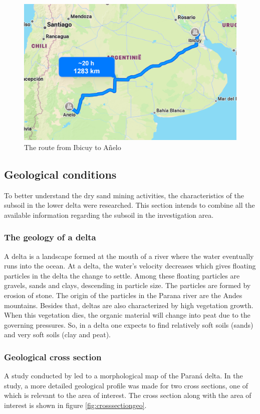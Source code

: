 \begin{figure}[H]
    \centering
    \includegraphics[width=0.6\linewidth]{figures/ch9/Routesand.png}
    \caption{The route from Ibicuy to Añelo}
    \label{fig:sandroute}
\end{figure}

\subsection{Geological conditions} \label{par:geology}
To better understand the dry sand mining activities, the characteristics of the subsoil in the lower delta were researched. This section intends to combine all the available information regarding the subsoil in the investigation area.

\subsubsection{The geology of a delta}
A delta is a landscape formed at the mouth of a river where the water eventually runs into the ocean. At a delta, the water's velocity decreases which gives floating particles in the delta the change to settle. Among these floating particles are gravels, sands and clays, descending in particle size. The particles are formed by erosion of stone. The origin of the particles in the Parana river are the Andes mountains. 
Besides that, deltas are also characterized by high vegetation growth. When this vegetation dies, the organic material will change into peat due to the governing pressures. So, in a delta one expects to find relatively soft soils (sands) and very soft soils (clay and peat).

\subsubsection{Geological cross section}
A study conducted by \citeauthor{cavallottoEvolucionCambiosAmbientales2005} led to a morphological map of the Paraná delta. In the study, a more detailed geological profile was made for two cross sections, one of which is relevant to the area of interest. The cross section along with the area of interest is shown in figure \ref{fig:crosssectiongeo}.

